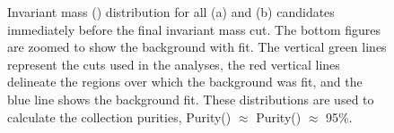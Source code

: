 \documentclass[/home/jesse/Analysis/FemtoAnalysis/AnalysisNotes/AnalysisNoteJBuxton.tex]{subfiles}
\begin{document}
\begin{figure}[h!]
  \centering
  \caption[\Lam and \ALam Purity]{Invariant mass (\minv) distribution for all \Lam (a) and \ALam (b) candidates immediately before the final invariant mass cut.  The bottom figures are zoomed to show the background with fit.  The vertical green lines represent the \minv cuts used in the analyses, the red vertical lines delineate the regions over which the background was fit, and the blue line shows the background fit.  These distributions are used to calculate the collection purities, Purity(\Lam) $\approx$ Purity(\ALam) $\approx$ 95\%.}
  \label{fig:cLamPurity}
\end{figure}
\end{document}
